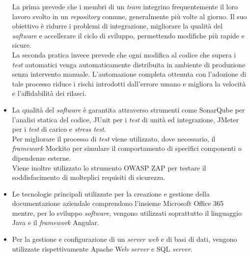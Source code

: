 \begin{itemize}
    La prima prevede che i membri di un \emph{team} integrino frequentemente il loro lavoro svolto in un \emph{repository} comune, generalmente più volte al giorno. Il suo obiettivo è ridurre i problemi di integrazione, migliorare la qualità del \emph{software} e accellerare il ciclo di sviluppo, permettendo modifiche più rapide e sicure.\\
    La seconda pratica invece prevede che ogni modifica al codice che supera i \emph{test} automatici venga automaticamente distribuita in ambiente di produzione senza intervento manuale. L'automazione completa ottenuta con l'adozione di tale processo riduce i rischi introdotti dall'errore umano e migliora la velocità e l'affidabilità dei rilasci.
    \item La qualità del \emph{software} è garantita attraverso strumenti come SonarQube per l'analisi statica del codice, JUnit per i \emph{test} di unità ed integrazione, JMeter per i \emph{test} di carico e \emph{stress test}.\\
    Per migliorare il processo di \emph{test} viene utilizzato, dove necessario, il \emph{framework} Mockito per simulare il comportamento di specifici componenti o dipendenze esterne.\\
    Viene inoltre utilizzato lo strumento OWASP ZAP per testare il soddisfacimento di molteplici requisiti di sicurezza. 
    \item Le tecnologie principali utilizzate per la creazione e gestione della documentazione aziendale comprendono l'insieme Microsoft Office 365 mentre, per lo sviluppo \emph{software}, vengono utilizzati soprattutto il linguaggio Java e il \emph{framework} Angular. 
    \item Per la gestione e configurazione di un \emph{server web} e di basi di dati, vengono utilizzate rispettivamente Apache Web \emph{server} e SQL \emph{server}. 
\end{itemize}

